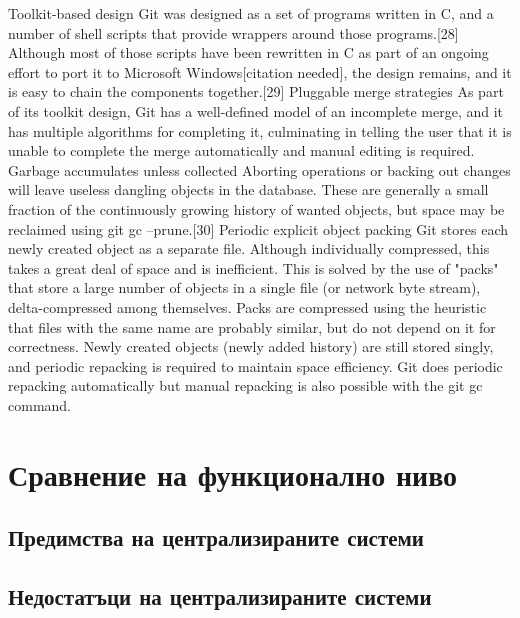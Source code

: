\documentclass[a4paper]{article}
\begin{document}
    Toolkit-based design
    Git was designed as a set of programs written in C, and a number of shell scripts that provide wrappers around those programs.[28] Although most of those scripts have been rewritten in C as part of an ongoing effort to port it to Microsoft Windows[citation needed], the design remains, and it is easy to chain the components together.[29]
    Pluggable merge strategies
    As part of its toolkit design, Git has a well-defined model of an incomplete merge, and it has multiple algorithms for completing it, culminating in telling the user that it is unable to complete the merge automatically and manual editing is required.
    Garbage accumulates unless collected
    Aborting operations or backing out changes will leave useless dangling objects in the database. These are generally a small fraction of the continuously growing history of wanted objects, but space may be reclaimed using git gc --prune.[30]
    Periodic explicit object packing
    Git stores each newly created object as a separate file. Although individually compressed, this takes a great deal of space and is inefficient. This is solved by the use of "packs" that store a large number of objects in a single file (or network byte stream), delta-compressed among themselves. Packs are compressed using the heuristic that files with the same name are probably similar, but do not depend on it for correctness. Newly created objects (newly added history) are still stored singly, and periodic repacking is required to maintain space efficiency. Git does periodic repacking automatically but manual repacking is also possible with the git gc command.

\section{Сравнение на функционално ниво}
  \subsection{Предимства на централизираните системи}

  \subsection{Недостатъци на централизираните системи}
\end{document}
